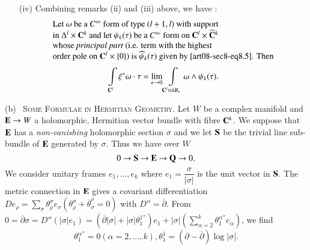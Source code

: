 \begin{remarks*}
\begin{itemize}
\item[(iv)] Combining remarks (ii) and (iii) above, we have :
\begin{equation}
\begin{array}{l}
\text{Let $\omega$ be a $C^{\infty}$ form of type $(l+1,l)$ with support}\\
\text{in $\Delta^{l}\times \mathbf{C}^{k}$ and let $\psi_{k}(\tau)$ be a $C^{\infty}$ form on $\mathbf{C}^{l}\times \widehat{\mathbf{C}}^{k}$}\\
\text{whose {\em principal part} (i.e. term with the highest}\\
\text{order pole on $\mathbf{C}^{l}\times \{0\}$) is $\widehat{\psi}_{k}(\tau)$ given by \eqref{art08-sec8-eq8.5}. Then}
\end{array}\label{art08-sec8-eq8.11}
\end{equation}
\begin{equation}
\int\limits_{\mathbf{C}^{l}}\xi^{*}\omega\cdot \tau=\lim\limits_{\epsilon\to 0}\int\limits_{\mathbf{C}^{l}\times \delta B_{\epsilon}}\omega\wedge \psi_{k}(\tau).\label{art08-sec8-eq8.12}
\end{equation}
\end{itemize}
\end{remarks*}

(b)~ \textsc{Some Formulae in Hermitian Geometry.} Let $W$ be a complex manifold and $\mathbf{E}\to W$ a holomorphic, Hermitian vector bundle with fibre $\mathbf{C}^{k}$. We suppose that $\mathbf{E}$ has a {\em non-vanishing} holomorphic section $\sigma$ and we let $\mathbf{S}$ be the trivial line sub-bundle of $\mathbf{E}$ generated by $\sigma$. Thus we have over $W$
\begin{equation}
0\to \mathbf{S}\to \mathbf{E}\to \mathbf{Q}\to 0.\label{art08-sec8-eq8.13}
\end{equation}
We consider unitary frames $e_{1},\ldots,e_{k}$ where $e_{1}=\dfrac{\sigma}{|\sigma|}$ is the unit vector in $\mathbf{S}$. The metric connection in $\mathbf{E}$ gives a covariant differentiation $De_{\rho}=\sum\limits_{\sigma}\theta^{\sigma}_{\rho}e_{\sigma}(\theta^{\sigma}_{\rho}+\overline{\theta}^{\rho}_{\sigma}=0)$ with $D''=\overline{\partial}$. From $0=\overline{\partial}\sigma=D''(|\sigma|e_{1})=(\overline{\partial}|\sigma|+|\sigma|\theta^{1''}_{1})e_{1}+|\sigma|\left(\sum\limits_{\alpha=2}^{k}\theta^{\alpha''}_{1}e_{\alpha}\right)$, we find
\begin{equation}
\theta^{\alpha''}_{1}=0(\alpha=2,\ldots,k),\theta^{1}_{1}=(\partial-\overline{\partial})\log |\sigma|.\label{art08-sec8-eq8.14}
\end{equation}

